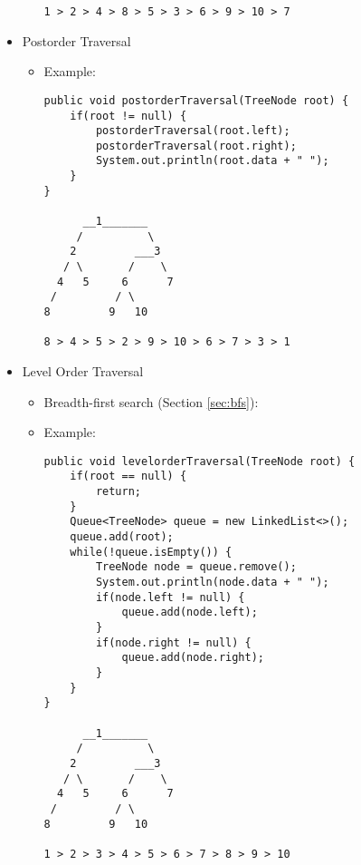 \documentclass[a4paper, 11.25pt]{article}
\begin{document}
\begin{itemize}
\begin{itemize}
\begin{lstlisting}[style=CStyle]
1 > 2 > 4 > 8 > 5 > 3 > 6 > 9 > 10 > 7\end{lstlisting}
        \end{itemize}
        \item Postorder Traversal
        \begin{itemize}
        \item Example:
        \begin{lstlisting}[style=CStyle]
public void postorderTraversal(TreeNode root) {
    if(root != null) {
        postorderTraversal(root.left);
        postorderTraversal(root.right);
        System.out.println(root.data + " ");
    }
}
    
      __1_______
     /          \
    2         ___3
   / \       /    \
  4   5     6      7
 /         / \
8         9   10

8 > 4 > 5 > 2 > 9 > 10 > 6 > 7 > 3 > 1\end{lstlisting}
        \end{itemize}
        \item Level Order Traversal
        \begin{itemize}
        \item Breadth-first search (Section \ref{sec:bfs}):
        \item Example:
        \begin{lstlisting}[style=CStyle]
public void levelorderTraversal(TreeNode root) {
    if(root == null) {
        return;
    }
    Queue<TreeNode> queue = new LinkedList<>();
    queue.add(root);
    while(!queue.isEmpty()) {
        TreeNode node = queue.remove();
        System.out.println(node.data + " "); 
        if(node.left != null) {
            queue.add(node.left);
        }
        if(node.right != null) {
            queue.add(node.right);
        }
    }
}
    
      __1_______
     /          \
    2         ___3
   / \       /    \
  4   5     6      7
 /         / \
8         9   10

1 > 2 > 3 > 4 > 5 > 6 > 7 > 8 > 9 > 10\end{lstlisting}
        \end{itemize}
\end{itemize}
\end{document}
